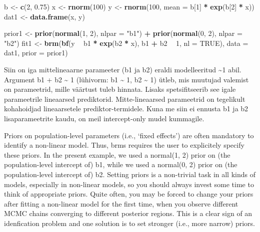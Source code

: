 \documentclass[]{book}
\newenvironment{Shaded}{\begin{snugshade}}{\end{snugshade}}
\newcommand{\DataTypeTok}[1]{\textcolor[rgb]{0.13,0.29,0.53}{#1}}
\newcommand{\DecValTok}[1]{\textcolor[rgb]{0.00,0.00,0.81}{#1}}
\newcommand{\FloatTok}[1]{\textcolor[rgb]{0.00,0.00,0.81}{#1}}
\newcommand{\KeywordTok}[1]{\textcolor[rgb]{0.13,0.29,0.53}{\textbf{#1}}}
\newcommand{\NormalTok}[1]{#1}
\newcommand{\OperatorTok}[1]{\textcolor[rgb]{0.81,0.36,0.00}{\textbf{#1}}}
\newcommand{\OtherTok}[1]{\textcolor[rgb]{0.56,0.35,0.01}{#1}}
\newcommand{\StringTok}[1]{\textcolor[rgb]{0.31,0.60,0.02}{#1}}
\begin{document}
\begin{Shaded}
\begin{Highlighting}[]
\NormalTok{b <-}\StringTok{ }\KeywordTok{c}\NormalTok{(}\DecValTok{2}\NormalTok{, }\FloatTok{0.75}\NormalTok{)}
\NormalTok{x <-}\StringTok{ }\KeywordTok{rnorm}\NormalTok{(}\DecValTok{100}\NormalTok{)}
\NormalTok{y <-}\StringTok{ }\KeywordTok{rnorm}\NormalTok{(}\DecValTok{100}\NormalTok{, }\DataTypeTok{mean =}\NormalTok{ b[}\DecValTok{1}\NormalTok{] }\OperatorTok{*}\StringTok{ }\KeywordTok{exp}\NormalTok{(b[}\DecValTok{2}\NormalTok{] }\OperatorTok{*}\StringTok{ }\NormalTok{x))}
\NormalTok{dat1 <-}\StringTok{ }\KeywordTok{data.frame}\NormalTok{(x, y)}

\NormalTok{prior1 <-}\StringTok{ }\KeywordTok{prior}\NormalTok{(}\KeywordTok{normal}\NormalTok{(}\DecValTok{1}\NormalTok{, }\DecValTok{2}\NormalTok{), }\DataTypeTok{nlpar =} \StringTok{"b1"}\NormalTok{) }\OperatorTok{+}
\StringTok{  }\KeywordTok{prior}\NormalTok{(}\KeywordTok{normal}\NormalTok{(}\DecValTok{0}\NormalTok{, }\DecValTok{2}\NormalTok{), }\DataTypeTok{nlpar =} \StringTok{"b2"}\NormalTok{)}
\NormalTok{fit1 <-}\StringTok{ }\KeywordTok{brm}\NormalTok{(}\KeywordTok{bf}\NormalTok{(y }\OperatorTok{~}\StringTok{ }\NormalTok{b1 }\OperatorTok{*}\StringTok{ }\KeywordTok{exp}\NormalTok{(b2 }\OperatorTok{*}\StringTok{ }\NormalTok{x), b1 }\OperatorTok{+}\StringTok{ }\NormalTok{b2 }\OperatorTok{~}\StringTok{ }\DecValTok{1}\NormalTok{, }\DataTypeTok{nl =} \OtherTok{TRUE}\NormalTok{),}
            \DataTypeTok{data =}\NormalTok{ dat1, }\DataTypeTok{prior =}\NormalTok{ prior1)}
\end{Highlighting}
\end{Shaded}

Siin on iga mittelineaarne parameeter (b1 ja b2) eraldi modelleeritud \textasciitilde{}1 abil. Argument b1 + b2 \textasciitilde{} 1 (lühivorm: b1 \textasciitilde{} 1, b2 \textasciitilde{} 1) ütleb, mis muutujad valemist on parameetrid, mille väärtust tuleb hinnata. Lisaks spetsifitseerib see igale parameetrile lineaarsed prediktorid. Mitte-lineaarsed parameetrid on tegelikult kohahoidjad lineaarsetele prediktor-termidele. Kuna me siin ei ennusta b1 ja b2 lisaparameetrite kaudu, on meil intercept-only mudel kummagile.

Priors on population-level parameters (i.e., `fixed effects') are often mandatory to identify a non-linear model. Thus, brms requires the user to explicitely specify these priors. In the present example, we used a normal(1, 2) prior on (the population-level intercept of) b1, while we used a normal(0, 2) prior on (the population-level intercept of) b2. Setting priors is a non-trivial task in all kinds of models, especially in non-linear models, so you should always invest some time to think of appropriate priors. Quite often, you may be forced to change your priors after fitting a non-linear model for the first time, when you observe different MCMC chains converging to different posterior regions. This is a clear sign of an idenfication problem and one solution is to set stronger (i.e., more narrow) priors.
\end{document}
